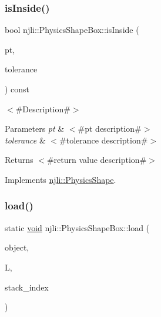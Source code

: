 \mbox{\label{classnjli_1_1_physics_shape_box_ad3df70682f66f1a613a14c03e5390cc2}} 
\subsubsection{\texorpdfstring{is\+Inside()}{isInside()}}
{\footnotesize\ttfamily bool njli\+::\+Physics\+Shape\+Box\+::is\+Inside (\begin{DoxyParamCaption}\item[{const bt\+Vector3 \&}]{pt,  }\item[{bt\+Scalar}]{tolerance }\end{DoxyParamCaption}) const\hspace{0.3cm}{\ttfamily [virtual]}}

$<$\#\+Description\#$>$


\begin{DoxyParams}{Parameters}
{\em pt} & $<$\#pt description\#$>$ \\
\hline
{\em tolerance} & $<$\#tolerance description\#$>$\\
\hline
\end{DoxyParams}
\begin{DoxyReturn}{Returns}
$<$\#return value description\#$>$ 
\end{DoxyReturn}


Implements \mbox{\hyperlink{classnjli_1_1_physics_shape_a346a118ddc9e6b446ae7a8586fee76fa}{njli\+::\+Physics\+Shape}}.

\mbox{\label{classnjli_1_1_physics_shape_box_a57859a8942039904a92578f289aa9236}} 
\subsubsection{\texorpdfstring{load()}{load()}}
{\footnotesize\ttfamily static \mbox{\hyperlink{_thread_8h_af1e856da2e658414cb2456cb6f7ebc66}{void}} njli\+::\+Physics\+Shape\+Box\+::load (\begin{DoxyParamCaption}\item[{\mbox{\hyperlink{classnjli_1_1_physics_shape_box}{Physics\+Shape\+Box}} \&}]{object,  }\item[{lua\+\_\+\+State $\ast$}]{L,  }\item[{int}]{stack\+\_\+index }\end{DoxyParamCaption})\hspace{0.3cm}{\ttfamily [static]}}


